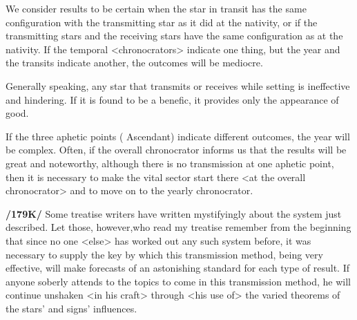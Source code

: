 We consider results to be certain when the star in transit has the same configuration with the transmitting star as it did at the nativity, or if the transmitting stars and the receiving stars have the same configuration as at the nativity. If the temporal <chronocrators> indicate one thing, but the year and the transits indicate another, the outcomes will be mediocre. 

Generally speaking, any star that transmits or receives while setting is ineffective and hindering. If it is found to be a benefic, it provides only the appearance of good. 

If the three aphetic points (\Sun\xspace \Moon\xspace Ascendant) indicate different outcomes, the year will be complex. Often, if the overall chronocrator informs us that the results will be great and noteworthy, although there is no transmission at one aphetic point, then it is necessary to make the vital sector start there <at the overall chronocrator> and to move on to the yearly chronocrator.

\textbf{/179K/} Some treatise writers have written mystifyingly about the system just described. Let those,
however,who read my treatise remember from the beginning that since no one <else> has worked out any such system before, it was necessary to supply the key by which this transmission method, being very effective, will make forecasts of an astonishing standard for each type of result. If anyone soberly attends to the topics to come in this transmission method, he will continue unshaken <in his craft> through <his use of> the varied theorems of the stars’ and signs’ influences.

\newpage